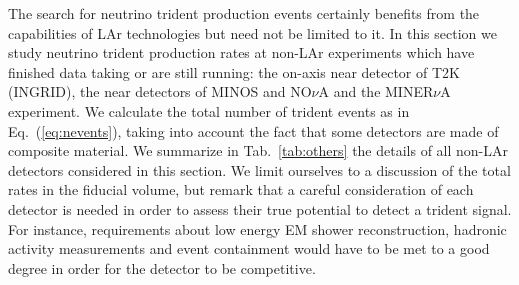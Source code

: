 \label{sec:others}
The search for neutrino trident production events certainly benefits from the capabilities of LAr technologies but need not be limited to it. In this section we study neutrino trident production rates at non-LAr experiments which have finished data taking or are still running: the on-axis near detector of T2K (INGRID), the near detectors of MINOS and NO$\nu$A and the MINER$\nu$A experiment. We calculate the total number of trident events as in Eq.~(\ref{eq:nevents}), taking into account the fact that some detectors are made of composite material. We summarize in Tab.~\ref{tab:others} the details of all non-LAr detectors considered in this section. We limit ourselves to a discussion of the total rates in the fiducial volume, but remark that a careful consideration of each detector is needed in order to assess their true potential to detect a trident signal. For instance, requirements about low energy EM shower reconstruction, hadronic activity measurements and event containment would have to be met to a good degree in order for the detector to be competitive. 

\begin{table}[t]
\begin{center}
\end{center}
\caption{\label{tab:others} Summary of the non-LAr detector set-up and values used in our calculations. The POT numbers are given for a neutrino (antineutrino) beam. For T2K-I and II 
neutrino and antineutrino beams have the same exposure.}
\end{table}


